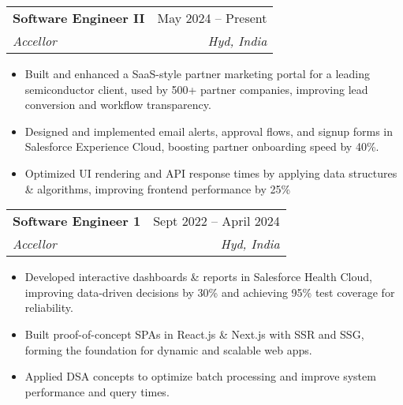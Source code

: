 \documentclass[letterpaper,11pt]{article}
\makeatletter
\newcommand{\resumeItem}[1]{
  \item\small{
    {#1 \vspace{-2pt}}
  }
}
\newcommand{\resumeSubheading}[4]{
  \vspace{-2pt}\item
    \begin{tabular*}{0.97\textwidth}[t]{l@{\extracolsep{\fill}}r}
      \textbf{#1} & #2 \\
      \textit{\small#3} & \textit{\small #4} \\
    \end{tabular*}\vspace{-7pt}
}
\newcommand{\resumeSubSubheading}[2]{
    \item
    \begin{tabular*}{0.97\textwidth}{l@{\extracolsep{\fill}}r}
      \textit{\small#1} & \textit{\small #2} \\
    \end{tabular*}\vspace{-7pt}
}
\newcommand{\resumeSubHeadingListEnd}{\end{itemize}}
\newcommand{\resumeItemListStart}{\begin{itemize}}
\newcommand{\resumeItemListEnd}{\end{itemize}\vspace{-5pt}}
\makeatother
\begin{document}
    \resumeSubheading
      {Software Engineer II}{May 2024 -- Present}
      {Accellor}{Hyd, India}
      \resumeItemListStart
        \resumeItem{Built and enhanced a SaaS-style partner marketing portal for a leading semiconductor client, used by 500+ partner companies, improving lead conversion and workflow transparency.}
        \resumeItem{Designed and implemented email alerts, approval flows, and signup forms in Salesforce Experience Cloud, boosting partner onboarding speed by 40\%.}
        \resumeItem{Optimized UI rendering and API response times by applying data structures \& algorithms, improving frontend performance by 25\%}
      \resumeItemListEnd
    \resumeSubheading
      {Software Engineer 1}{Sept 2022 -- April 2024}
      {Accellor}{Hyd, India}
      \resumeItemListStart
        \resumeItem{Developed interactive dashboards \& reports in Salesforce Health Cloud, improving data-driven decisions by 30\% and achieving 95\% test coverage for reliability.}
        \resumeItem{Built proof-of-concept SPAs in React.js \& Next.js with SSR and SSG, forming the foundation for dynamic and scalable web apps.}
        \resumeItem{Applied DSA concepts to optimize batch processing and improve system performance and query times.}
      \resumeItemListEnd


\end{document}
